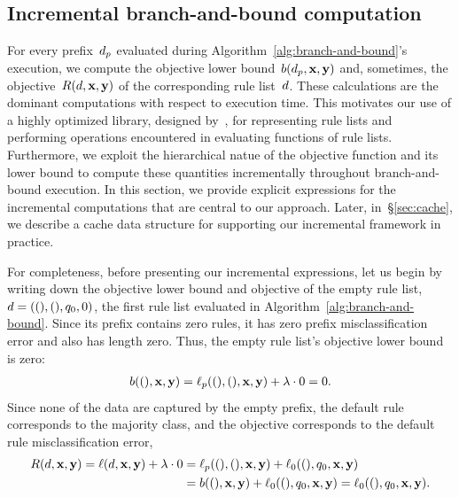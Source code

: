 \subsection{Incremental branch-and-bound computation}
\label{sec:incremental}

For every prefix~$d_p$ evaluated during
Algorithm~\ref{alg:branch-and-bound}'s execution, we compute
the objective lower bound~${b(d_p, \mathbf{x}, \mathbf{y})}$ and, sometimes,
the objective~${R({d}, \mathbf{x}, \mathbf{y})}$ of the corresponding rule list~${d}$.
%
These calculations are the dominant computations with respect to execution time.
%
This motivates our use of a highly optimized library,
designed by~\citet{YangRuSe16}, for representing rule lists and
performing operations encountered in evaluating functions of rule lists.
%
Furthermore, we exploit the hierarchical natue of the objective
function and its lower bound to compute these quantities
incrementally throughout branch-and-bound execution.
%
In this section, we provide explicit expressions for
the incremental computations that are central to our approach.
%
Later, in~\S\ref{sec:cache}, we describe a cache data structure
for supporting our incremental framework in practice.

For completeness, before presenting our incremental expressions,
let us begin by writing down the objective lower bound and objective
of the empty rule list, ${{d} = ((), (), q_0, 0)}$,
the first rule list evaluated in Algorithm~\ref{alg:branch-and-bound}.
%
Since its prefix contains zero rules, it has zero prefix
misclassification error and also has length zero.
%
Thus, the empty rule list's objective lower bound is zero:
\begin{align}
  b((), \x, \y) = \Loss_p((), (), \x, \y) + \Reg \cdot 0 = 0.
\end{align}
%
Since none of the data are captured by the empty prefix, the default rule
corresponds to the majority class, and the objective corresponds to the
default rule misclassification error, \ie
\begin{align}
  \Obj(\RL, \x, \y) = \Loss(\RL, \x, \y) + \Reg \cdot 0
  &= \Loss_p((), (), \x, \y) + \Loss_0((), \Default, \x, \y) \nn \\
  &= b((), \x, \y) + \Loss_0((), \Default, \x, \y) = \Loss_0((), \Default, \x, \y).
\end{align}

